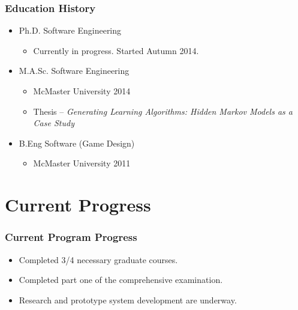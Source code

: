 \documentclass{beamer}
\begin{document}
\begin{frame}

\frametitle{Education History}

\begin{itemize}
\item Ph.D. Software Engineering
	\begin{itemize}
	\item Currently in progress. Started Autumn 2014.
	\end{itemize}
\item M.A.Sc. Software Engineering
	\begin{itemize}
	\item McMaster University 2014
	\item Thesis -- \textit{Generating Learning Algorithms: Hidden Markov Models as a Case Study}
	\end{itemize}
\item B.Eng Software (Game Design) 
\begin{itemize}
	\item McMaster University 2011
	\end{itemize}

\end{itemize}
\end{frame}

\section[Progress]{Current Progress}



\begin{frame}
\frametitle{Current Program Progress}
\begin{itemize}
\item Completed 3/4 necessary graduate courses.
\item Completed part one of the comprehensive examination.
\item Research and prototype system development are underway.
\end{itemize}
\end{frame}
\end{document}
